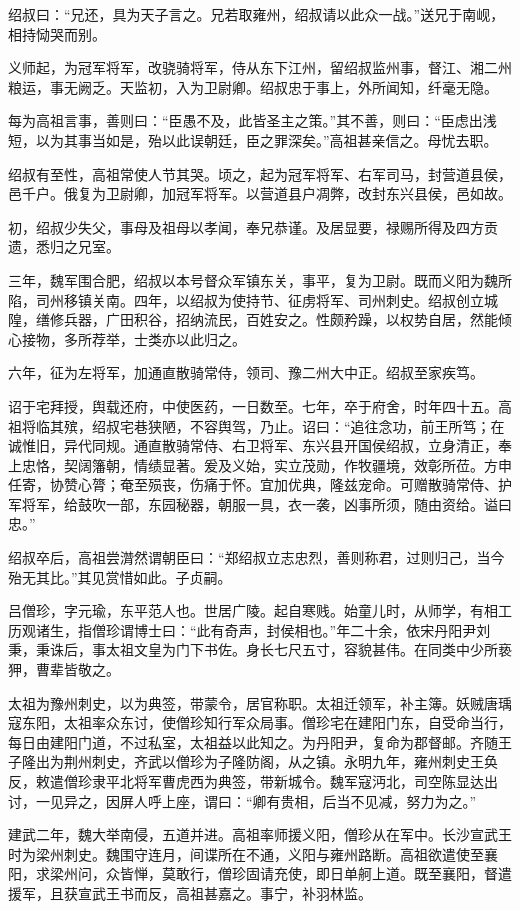 \documentclass[12pt,UTF8]{ctexbook}
\begin{document}
绍叔曰：“兄还，具为天子言之。兄若取雍州，绍叔请以此众一战。”送兄于南岘，相持恸哭而别。

义师起，为冠军将军，改骁骑将军，侍从东下江州，留绍叔监州事，督江、湘二州粮运，事无阙乏。天监初，入为卫尉卿。绍叔忠于事上，外所闻知，纤毫无隐。

每为高祖言事，善则曰：“臣愚不及，此皆圣主之策。”其不善，则曰：“臣虑出浅短，以为其事当如是，殆以此误朝廷，臣之罪深矣。”高祖甚亲信之。母忧去职。

绍叔有至性，高祖常使人节其哭。顷之，起为冠军将军、右军司马，封营道县侯，邑千户。俄复为卫尉卿，加冠军将军。以营道县户凋弊，改封东兴县侯，邑如故。

初，绍叔少失父，事母及祖母以孝闻，奉兄恭谨。及居显要，禄赐所得及四方贡遗，悉归之兄室。

三年，魏军围合肥，绍叔以本号督众军镇东关，事平，复为卫尉。既而义阳为魏所陷，司州移镇关南。四年，以绍叔为使持节、征虏将军、司州刺史。绍叔创立城隍，缮修兵器，广田积谷，招纳流民，百姓安之。性颇矜躁，以权势自居，然能倾心接物，多所荐举，士类亦以此归之。

六年，征为左将军，加通直散骑常侍，领司、豫二州大中正。绍叔至家疾笃。

诏于宅拜授，舆载还府，中使医药，一日数至。七年，卒于府舍，时年四十五。高祖将临其殡，绍叔宅巷狭陋，不容舆驾，乃止。诏曰：“追往念功，前王所笃；在诚惟旧，异代同规。通直散骑常侍、右卫将军、东兴县开国侯绍叔，立身清正，奉上忠恪，契阔籓朝，情绩显著。爰及义始，实立茂勋，作牧疆境，效彰所莅。方申任寄，协赞心膂；奄至殒丧，伤痛于怀。宜加优典，隆兹宠命。可赠散骑常侍、护军将军，给鼓吹一部，东园秘器，朝服一具，衣一袭，凶事所须，随由资给。谥曰忠。”

绍叔卒后，高祖尝潸然谓朝臣曰：“郑绍叔立志忠烈，善则称君，过则归己，当今殆无其比。”其见赏惜如此。子贞嗣。

吕僧珍，字元瑜，东平范人也。世居广陵。起自寒贱。始童儿时，从师学，有相工历观诸生，指僧珍谓博士曰：“此有奇声，封侯相也。”年二十余，依宋丹阳尹刘秉，秉诛后，事太祖文皇为门下书佐。身长七尺五寸，容貌甚伟。在同类中少所亵狎，曹辈皆敬之。

太祖为豫州刺史，以为典签，带蒙令，居官称职。太祖迁领军，补主簿。妖贼唐瑀寇东阳，太祖率众东讨，使僧珍知行军众局事。僧珍宅在建阳门东，自受命当行，每日由建阳门道，不过私室，太祖益以此知之。为丹阳尹，复命为郡督邮。齐随王子隆出为荆州刺史，齐武以僧珍为子隆防阁，从之镇。永明九年，雍州刺史王奂反，敕遣僧珍隶平北将军曹虎西为典签，带新城令。魏军寇沔北，司空陈显达出讨，一见异之，因屏人呼上座，谓曰：“卿有贵相，后当不见减，努力为之。”

建武二年，魏大举南侵，五道并进。高祖率师援义阳，僧珍从在军中。长沙宣武王时为梁州刺史。魏围守连月，间谍所在不通，义阳与雍州路断。高祖欲遣使至襄阳，求梁州问，众皆惮，莫敢行，僧珍固请充使，即日单舸上道。既至襄阳，督遣援军，且获宣武王书而反，高祖甚嘉之。事宁，补羽林监。
\end{document}
